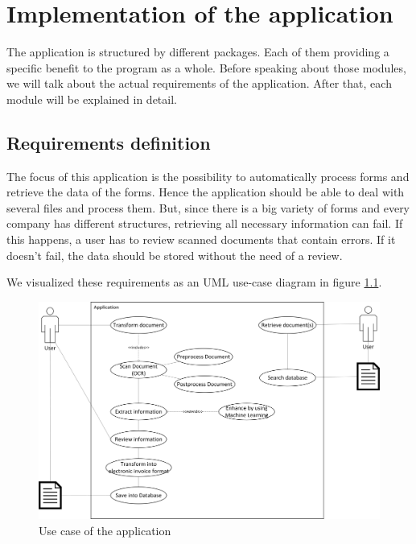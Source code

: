%
% 
\chapter{Implementation of the application}
\label{cha5}

The application is structured by different packages. Each of them providing a specific benefit to the program as a whole. Before speaking about those modules, we will talk about the actual requirements of the application. After that, each module will be explained in detail. %

\section{Requirements definition}
\label{sec5.1}

The focus of this application is the possibility to automatically process forms and retrieve the data of the forms. Hence the application should be able to deal with several files and process them. But, since there is a big variety of forms and every company has different structures, retrieving all necessary information can fail. If this happens, a user has to review scanned documents that contain errors. If it doesn't fail, the data should be stored without the need of a review.

We visualized these requirements as an UML use-case diagram in figure \ref{totalApplicationCase}.

\begin{figure}[ht!]
\centering
\includegraphics[width=\textwidth]{Images/UseCase/TotalApplicationCase.jpg}
\caption{Use case of the application \label{totalApplicationCase}}
\end{figure}

